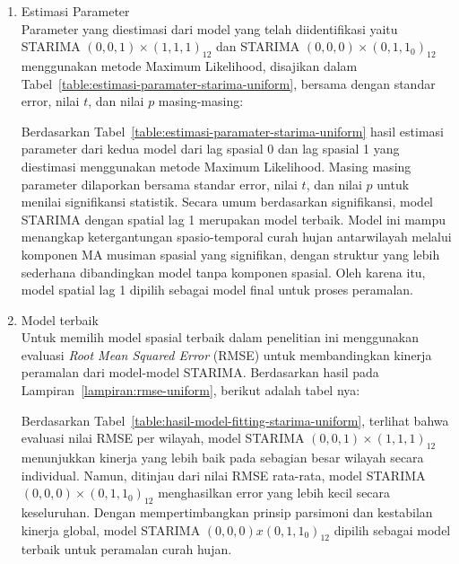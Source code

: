 \begin{enumerate}[label=\Alph*.]
    \item Estimasi Parameter \\
    Parameter yang diestimasi dari model yang telah diidentifikasi yaitu STARIMA $(0,0,1) \times (1,1,1)_{12}$ dan STARIMA $(0,0,0) \times (0,1,1_{0})_{12}$ menggunakan metode Maximum Likelihood, disajikan dalam Tabel~\ref{table:estimasi-paramater-starima-uniform}, bersama dengan standar error, nilai $t$, dan nilai $p$ masing-masing:
    
    Berdasarkan Tabel~\ref{table:estimasi-paramater-starima-uniform} hasil estimasi parameter dari kedua model dari lag spasial 0 dan lag spasial 1 yang diestimasi menggunakan metode Maximum Likelihood.
    Masing masing parameter dilaporkan bersama standar error, nilai $t$, dan nilai $p$ untuk menilai signifikansi statistik.
    Secara umum berdasarkan signifikansi, model STARIMA dengan spatial lag 1 merupakan model terbaik.
    Model ini mampu menangkap ketergantungan spasio-temporal curah hujan antarwilayah melalui komponen MA musiman spasial yang signifikan, dengan struktur yang lebih sederhana dibandingkan model tanpa komponen spasial.
    Oleh karena itu, model spatial lag 1 dipilih sebagai model final untuk proses peramalan.

    \item Model terbaik \\
    Untuk memilih model spasial terbaik dalam penelitian ini menggunakan evaluasi \textit{Root Mean Squared Error} (RMSE) untuk membandingkan kinerja peramalan dari model-model STARIMA. 
    Berdasarkan hasil pada Lampiran~\ref{lampiran:rmse-uniform}, berikut adalah tabel nya:
    
    Berdasarkan Tabel~\ref{table:hasil-model-fitting-starima-uniform}, terlihat bahwa evaluasi nilai RMSE per wilayah, model STARIMA $(0,0,1) \times (1,1,1)_{12}$ menunjukkan kinerja yang lebih baik pada sebagian besar wilayah secara individual.
    Namun, ditinjau dari nilai RMSE rata-rata, model STARIMA $(0,0,0) \times (0,1,1_{0})_{12}$ menghasilkan error yang lebih kecil secara keseluruhan.
    Dengan mempertimbangkan prinsip parsimoni dan kestabilan kinerja global, model STARIMA $(0,0,0) x (0,1,1_{0})_{12}$ dipilih sebagai model terbaik untuk peramalan curah hujan.


\end{enumerate}
